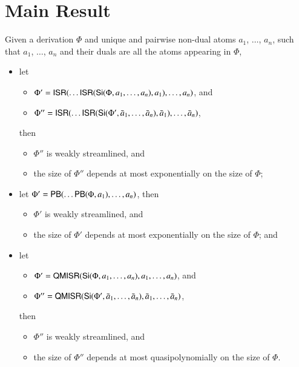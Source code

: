 \chapter{Main Result}\label{chapter:MainResult}

\begin{theorem}\label{theorem:WeakStreamlining}
Given a derivation $\Phi$ and unique and pairwise non-dual atoms $a_1$, $\dots$, $a_n$, such that $a_1$, $\dots$, $a_n$ and their duals are all the atoms appearing in $\Phi$,
\begin{itemize}
\item let
\begin{itemize}
\item $\Phi'=\mathsf{ISR}(\dots\mathsf{ISR}(\mathsf{Si}(\Phi,a_1,\dots,a_n),a_1),\dots,a_n)$, and
\item $\Phi''=\mathsf{ISR}(\dots\mathsf{ISR}(\mathsf{Si}(\Phi',\bar a_1,\dots,\bar a_n),\bar a_1),\dots,\bar a_n)$,
\end{itemize}
then
\begin{itemize}
\item $\Phi''$ is weakly streamlined, and
\item the size of $\Phi''$ depends at most exponentially on the size of\/ $\Phi$;
\end{itemize}
\item let\/ $\Phi'=\mathsf{PB}(\dots\mathsf{PB}(\Phi,a_1),\dots,a_n)$, then
\begin{itemize}
\item $\Phi'$ is weakly streamlined, and
\item the size of\/ $\Phi'$ depends at most exponentially on the size of\/ $\Phi$; and
\end{itemize}
\item let
\begin{itemize}
\item $\Phi'=\mathsf{QMISR}(\mathsf{Si}(\Phi,a_1,\dots,a_n),a_1,\dots,a_n)$, and
\item $\Phi''=\mathsf{QMISR}(\mathsf{Si}(\Phi',\bar a_1,\dots,\bar a_n),\bar a_1,\dots,\bar a_n)$,
\end{itemize}
then
\begin{itemize}
\item $\Phi''$ is weakly streamlined, and
\item the size of\/ $\Phi''$ depends at most quasipolynomially on the size of\/ $\Phi$.
\end{itemize}
\end{itemize}
\end{theorem}